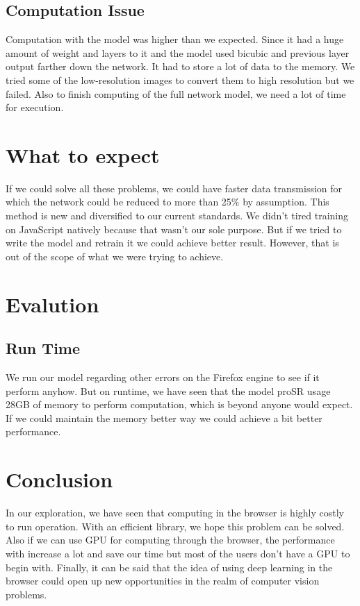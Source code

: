 \documentclass[a4paper,12pt]{article}
\begin{document}
\subsection{Computation Issue}
Computation with the model was higher than we expected. Since it had a huge amount of weight and layers to it and the model used bicubic and previous layer output farther down the network. It had to store a lot of data to the memory. We tried some of the low-resolution images to convert them to high resolution but we failed. Also to finish computing of the full network model,
we need a lot of time for execution.


\section{What to expect}
If we could solve all these problems, we could have faster data transmission for which the network could be reduced to more than 25\% by assumption. This method is new and diversified to our current standards. We didn't tired training on JavaScript natively because that wasn't our sole purpose. But if we tried to write the model and retrain it we could achieve better result. However, that is out of the scope of what we were trying to achieve.

\section{Evalution}
\subsection{Run Time}
We run our model regarding other errors on the Firefox engine to see if it perform anyhow. But on runtime, we have seen that the model proSR usage 28GB of memory to perform computation, which is beyond anyone would expect. If we could maintain the memory better way we could achieve a bit better performance.

\section{Conclusion}
 In our exploration, we have seen that computing in the browser is highly costly to run operation. With an efficient library, we hope this problem can be solved. Also if we can use GPU for computing through the browser, the performance with increase a lot and save our time but most of the users don't have a GPU to begin with. Finally, it can be said that the idea of using deep learning in the browser could open up new opportunities in the realm of computer vision problems. 
\end{document}
